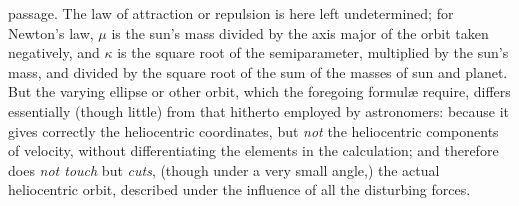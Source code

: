 passage.  The law of attraction or repulsion is here left
undetermined; for {\sc Newton's} law, $\mu$ is the sun's mass
divided by the axis major of the orbit taken negatively,
and $\kappa$ is the square root of the semiparameter,
multiplied by the sun's mass, and divided by the square
root of the sum of the masses of sun and planet.
But the varying ellipse or other orbit, which the foregoing
formul{\ae} require, differs essentially (though little)
from that hitherto employed by astronomers: because it
gives correctly the heliocentric coordinates, but {\it not\/}
the heliocentric components of velocity, without differentiating
the elements in the calculation; and therefore does {\it not
touch\/} but {\it cuts\/}, (though under a very small angle,)
the actual heliocentric orbit, described under the influence
of all the disturbing forces.

\medskip

